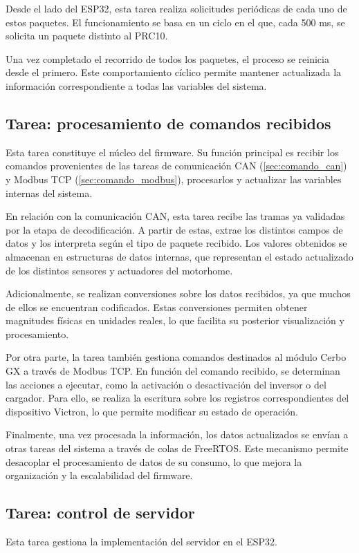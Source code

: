 Desde el lado del ESP32, esta tarea realiza solicitudes periódicas de
cada uno de estos paquetes. El funcionamiento se basa en un ciclo en el
que, cada 500 ms, se solicita un paquete distinto al PRC10.

Una vez completado el recorrido de todos los paquetes, el proceso se
reinicia desde el primero. Este comportamiento cíclico permite mantener
actualizada la información correspondiente a todas las variables del
sistema.

\subsection{Tarea: procesamiento de comandos recibidos}
\label{sec:procesamiento_comandos}
Esta tarea constituye el núcleo del firmware. Su función principal es
recibir los comandos provenientes de las tareas de comunicación CAN
(\ref{sec:comando_can}) y Modbus TCP (\ref{sec:comando_modbus}), procesarlos
y actualizar las variables internas del sistema.

En relación con la comunicación CAN, esta tarea recibe las tramas ya
validadas por la etapa de decodificación. A partir de estas,
extrae los distintos campos de datos y los interpreta según el tipo de
paquete recibido. Los valores obtenidos se almacenan en estructuras de
datos internas, que representan el estado actualizado de los distintos
sensores y actuadores del motorhome.

Adicionalmente, se realizan conversiones sobre los datos recibidos, ya que muchos de ellos se encuentran codificados. Estas conversiones permiten obtener magnitudes físicas en unidades reales, lo que facilita su posterior visualización y procesamiento.

Por otra parte, la tarea también gestiona comandos destinados al módulo
Cerbo GX a través de Modbus TCP. En función del comando recibido, se
determinan las acciones a ejecutar, como la activación o desactivación
del inversor o del cargador. Para ello, se realiza la escritura sobre
los registros correspondientes del dispositivo Victron, lo que permite
modificar su estado de operación.

Finalmente, una vez procesada la información, los datos actualizados se envían a otras tareas del sistema a través de colas de FreeRTOS. Este mecanismo permite desacoplar el procesamiento de datos de su consumo, lo que mejora la organización y la escalabilidad del firmware.

\subsection{Tarea: control de servidor}
\label{sec:tarea_server}
Esta tarea gestiona la implementación del servidor en el ESP32.

